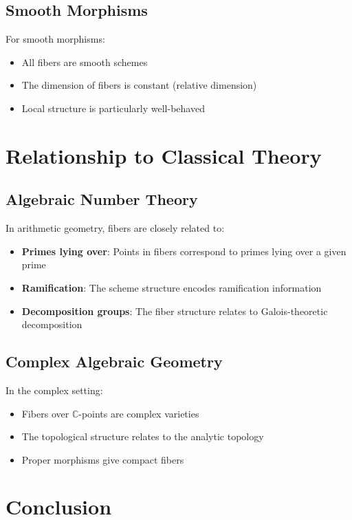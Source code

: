\documentclass{article}
\theoremstyle{definition}
\begin{document}
\subsection{Smooth Morphisms}

For smooth morphisms:
\begin{itemize}
\item All fibers are smooth schemes
\item The dimension of fibers is constant (relative dimension)
\item Local structure is particularly well-behaved
\end{itemize}

\section{Relationship to Classical Theory}

\subsection{Algebraic Number Theory}

In arithmetic geometry, fibers are closely related to:
\begin{itemize}
\item \textbf{Primes lying over}: Points in fibers correspond to primes lying over a given prime
\item \textbf{Ramification}: The scheme structure encodes ramification information
\item \textbf{Decomposition groups}: The fiber structure relates to Galois-theoretic decomposition
\end{itemize}

\subsection{Complex Algebraic Geometry}

In the complex setting:
\begin{itemize}
\item Fibers over $\mathbb{C}$-points are complex varieties
\item The topological structure relates to the analytic topology
\item Proper morphisms give compact fibers
\end{itemize}

\section{Conclusion}
\end{document}
